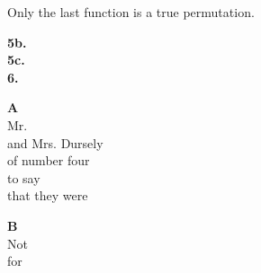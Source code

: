 \documentclass[10pt]{amsart}
\begin{document}
Only the last function is a true permutation.

\textbf{5b.} \\

\textbf{5c.} \\

\textbf{6.} \\

\begin{tabular}[l]
  \textbf{A} \\


  Mr. \\
  and Mrs. Dursely \\
  of number four\\
  to say \\
  that they were \\

\end{tabular}

\begin{tabular}[l]
  \textbf{B} \\


  Not \\
  for \\

\end{tabular}
\end{document}
